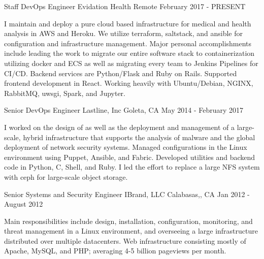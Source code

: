 
\begin{cventries}
  \cventry
    {Staff DevOps Engineer} %
    {Evidation Health} %
    {Remote} %
    {February 2017 - PRESENT} %
    {
      \begin{cvitems} %
        {I maintain and deploy a pure cloud based infrastructure for medical and health analysis in
        AWS and Heroku. We utilize terraform, saltstack, and ansible for configuration and
        infrastructure management.
        Major personal accomplishments include leading the work to migrate our entire software stack
        to containerization utilizing docker and ECS as well as migrating every team to Jenkins
        Pipelines for CI/CD.
        Backend services are Python/Flask and Ruby on Rails. Supported frontend development in
        React.
        Working heavily with Ubuntu/Debian, NGINX, RabbitMQ, uwsgi, Spark, and Jupyter.}
      \end{cvitems}
    }

  \cventry
    {Senior DevOps Engineer} %
    {Lastline, Inc} %
    {Goleta, CA} %
    {May 2014 - February 2017} %
    {
      \begin{cvitems} %
        \item {I worked on the design of as well as the deployment and management of a large-scale, hybrid
        infrastructure that supports the analysis of malware and the global deployment of network
        security systems.
        Managed configurations in the Linux environment using Puppet, Ansible, and Fabric.
        Developed utilities and backend code in Python, C, Shell, and Ruby. I led the effort to replace a
        large NFS system with ceph for large-scale object storage.}
      \end{cvitems}
    }

  \cventry
    {Senior Systems and Security Engineer} %
    {IBrand, LLC} %
    {Calabasas,, CA} %
    {Jan 2012 - August 2012} %
    {
      \begin{cvitems} %
        \item {Main responsibilities include design, installation, configuration, monitoring, and threat
        management in a Linux environment, and overseeing a large infrastructure distributed over
        multiple datacenters. Web infrastructure consisting mostly of Apache, MySQL, and PHP;
        averaging 4-5 billion pageviews per month.}
      \end{cvitems}
    }


\end{cventries}
